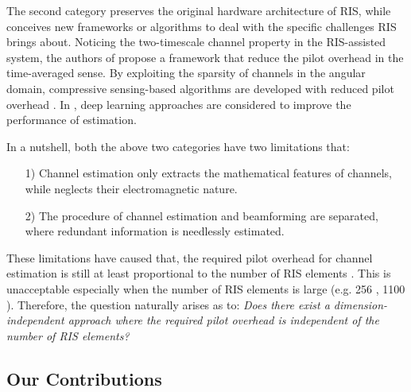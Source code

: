 \documentclass[12pt,draftclsnofoot,journal,onecolumn]{IEEEtran}
\theoremstyle{nonumberplain}
\begin{document}
The second category preserves the original hardware architecture of RIS, while conceives new frameworks or algorithms to deal with the specific challenges RIS brings about.
Noticing the two-timescale channel property in the RIS-assisted system, the authors of \cite{Huchen} propose a framework that reduce the pilot overhead in the time-averaged sense.
By exploiting the sparsity of channels in the angular domain, compressive sensing-based algorithms are developed with reduced pilot overhead \cite{wang2020compressed}.
In \cite{kundu2021channel}, deep learning approaches are considered to improve the performance of estimation.

In a nutshell, both the above two categories have two limitations that:
\begin{enumerate}
\item[1)]  Channel estimation only extracts the mathematical features of channels, while neglects their electromagnetic nature.
\item[2)] The procedure of channel estimation and beamforming are separated, where redundant information is needlessly estimated.
\end{enumerate}
These limitations have caused that, the required pilot overhead for channel estimation is still at least proportional to the number of RIS elements \cite{taha2021enabling,alexandropoulos2020hardware,nguyen2021hybrid,Huchen,wang2020compressed,kundu2021channel}.
This is unacceptable especially when the number of RIS elements is large (e.g. 256 \cite{dai2020reconfigurable}, 1100 \cite{pei2021ris}).
Therefore, the question naturally arises as to: {\it Does there exist a dimension-independent approach where the required pilot overhead is independent of the number of RIS elements?}

\subsection{Our Contributions}
\label{Our Contributions}
\end{document}
